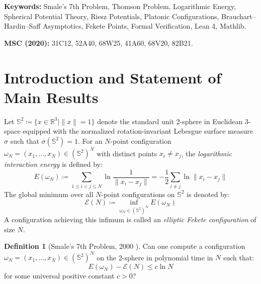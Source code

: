 \documentclass[11pt,a4paper]{article}
\theoremstyle{definition}
\newtheorem{definition}[theorem]{Definition}
\begin{document}
\vspace{0.5em}
\noindent\textbf{Keywords:} Smale's 7th Problem, Thomson Problem, Logarithmic Energy, Spherical Potential Theory, Riesz Potentials, Platonic Configurations, Brauchart--Hardin--Saff Asymptotics, Fekete Points, Formal Verification, Lean 4, Mathlib.

\noindent\textbf{MSC (2020):} 31C12, 52A40, 68W25, 41A60, 68V20, 82B21.

\tableofcontents
\newpage

\section{Introduction and Statement of Main Results}

Let $\mathbb{S}^2 \coloneqq \{ x \in \mathbb{R}^3 \mid \|x\| = 1 \}$ denote the standard unit 2-sphere in Euclidean 3-space equipped with the normalized rotation-invariant Lebesgue surface measure $\sigma$ such that $\sigma(\mathbb{S}^2) = 1$.
For an $N$-point configuration $\omega_N = (x_1, \dots, x_N) \in (\mathbb{S}^2)^N$ with distinct points $x_i \ne x_j$, the \emph{logarithmic interaction energy} is defined by:
\begin{equation}\label{eq:discrete_energy}
E(\omega_N) \coloneqq \sum_{1 \le i < j \le N} \ln \frac{1}{\|x_i - x_j\|} = -\frac{1}{2} \sum_{i \ne j} \ln \|x_i - x_j\|
\end{equation}
The global minimum over all $N$-point configurations on $\mathbb{S}^2$ is denoted by:
\begin{equation}\label{eq:minimal_energy}
\mathcal{E}(N) \coloneqq \inf_{\omega_N \in (\mathbb{S}^2)^N} E(\omega_N)
\end{equation}
A configuration achieving this infimum is called an \emph{elliptic Fekete configuration} of size $N$.

\begin{definition}[Smale's 7th Problem, 2000 \cite{smale2000}]\label{def:smale_7}
Can one compute a configuration $\omega_N = (x_1, \dots, x_N) \in (\mathbb{S}^2)^N$ on the 2-sphere in polynomial time in $N$ such that:
\begin{equation}\label{eq:smale_7_bound}
E(\omega_N) - \mathcal{E}(N) \le c \ln N
\end{equation}
for some universal positive constant $c > 0$?
\end{definition}
\end{document}
